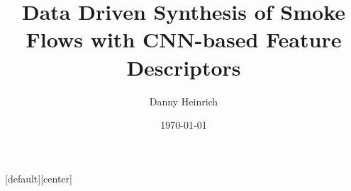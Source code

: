 \usepackage[english]{babel}
\usepackage[utf8]{inputenc}
\usepackage[T1]{fontenc}																								
\usepackage{lmodern}
\usepackage{graphicx}
\usepackage{tabularx}
\usepackage{float}
\usepackage{multirow}
\usepackage[citestyle=numeric,bibstyle=alphabetic,backend=bibtex]{biblatex}
\usepackage{amsmath}
\usepackage{amssymb}
\usepackage{amsthm}
\usepackage{listings}
\usepackage[]{diagbox}
\usepackage[font={scriptsize,it}]{caption}
\usepackage{graphicx}
\usepackage{tikz}
\usepackage{pgfplots}
\usepackage{multimedia}
\usepackage{tcolorbox}
\usepackage{gensymb}


\let\vec\mathbf
\usetikzlibrary{fit,positioning,arrows,automata}
\usetikzlibrary{backgrounds}
\usepackage{adjustbox}
\newcommand{\vect}[1]{\boldsymbol{#1}} %
\newcommand{\enqq}[1]{``#1''\xspace}	%




\usepackage[noend]{algpseudocode}
\usepackage[ruled, vlined]{algorithm2e}

\usepackage{subfigure}

\usepackage{mathtools}

\DeclarePairedDelimiter\abs{\lvert}{\rvert}%
\DeclarePairedDelimiter\norm{\lVert}{\rVert}%

\makeatletter
\let\oldabs\abs
\def\abs{\@ifstar{\oldabs}{\oldabs*}}
%
\let\oldnorm\norm
\def\norm{\@ifstar{\oldnorm}{\oldnorm*}}
\makeatother

\makeatletter
\def\BState{\State\hskip-\ALG@thistlm}
\makeatother
{}
\title[]{Data Driven Synthesis of Smoke Flows with CNN-based Feature Descriptors}
\author{Danny Heinrich}

\setlength{\marginparwidth}{2cm}
\date{\today}
[default][center]

